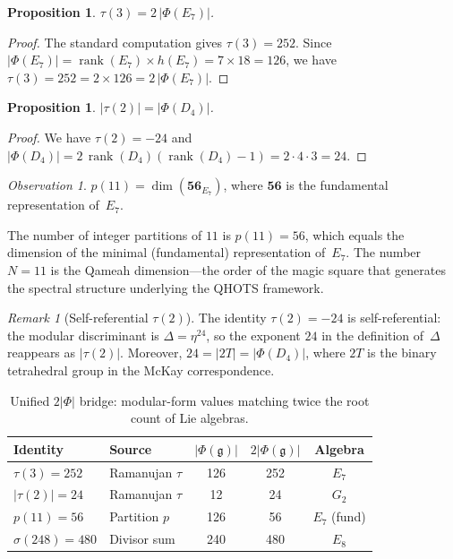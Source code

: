 \documentclass[11pt]{amsart}
\theoremstyle{plain}
\newtheorem{proposition}[theorem]{Proposition}
\theoremstyle{definition}
\theoremstyle{remark}
\newtheorem{remark}[theorem]{Remark}
\newtheorem{observation}[theorem]{Observation}
\newcommand{\fg}{\mathfrak{g}}
\renewcommand{\Phi}{\varPhi}
\newcommand{\rank}{\operatorname{rank}}
\begin{document}
\begin{proposition}\label{prop:tau-3-E7}
$\tau(3) = 2\,|\Phi(E_7)|$.
\end{proposition}

\begin{proof}
The standard computation gives $\tau(3) = 252$.  Since
$|\Phi(E_7)| = \rank(E_7) \times h(E_7) = 7 \times 18 = 126$,
we have $\tau(3) = 252 = 2 \times 126 = 2\,|\Phi(E_7)|$.
\end{proof}

\begin{proposition}\label{prop:tau-2-D4}
$|\tau(2)| = |\Phi(D_4)|$.
\end{proposition}

\begin{proof}
We have $\tau(2) = -24$ and
$|\Phi(D_4)| = 2\,\rank(D_4)(\rank(D_4)-1) = 2 \cdot 4 \cdot 3 = 24$.
\end{proof}

\begin{observation}\label{obs:partition-E7}
$p(11) = \dim(\mathbf{56}_{E_7})$, where $\mathbf{56}$ is the
fundamental representation of~$E_7$.
\end{observation}

The number of integer partitions of $11$ is $p(11) = 56$, which
equals the dimension of the minimal (fundamental) representation
of~$E_7$.  The number $N = 11$ is the Qameah dimension---the order
of the magic square that generates the spectral structure underlying
the QHOTS framework.

\begin{remark}[Self-referential $\tau(2)$]\label{rem:tau-self-ref}
The identity $\tau(2) = -24$ is self-referential: the modular
discriminant is $\Delta = \eta^{24}$, so the exponent $24$
in the definition of~$\Delta$ reappears as $|\tau(2)|$.
Moreover, $24 = |2T| = |\Phi(D_4)|$, where $2T$ is the binary
tetrahedral group in the McKay correspondence.
\end{remark}

\begin{table}[ht]
\centering
\caption{Unified $2|\Phi|$ bridge: modular-form values matching
  twice the root count of Lie algebras.}\label{tab:2phi-bridge}
\begin{tabular}{@{}llccc@{}}
\toprule
\textbf{Identity} & \textbf{Source} & $|\Phi(\fg)|$ &
  $2|\Phi(\fg)|$ & \textbf{Algebra} \\
\midrule
$\tau(3) = 252$      & Ramanujan $\tau$ & 126 & 252 & $E_7$ \\
$|\tau(2)| = 24$     & Ramanujan $\tau$ &  12 &  24 & $G_2$ \\
$p(11) = 56$         & Partition $p$    & 126 &  56 & $E_7$ (fund) \\
$\sigma(248) = 480$  & Divisor sum      & 240 & 480 & $E_8$ \\
\bottomrule
\end{tabular}
\end{table}
\end{document}
